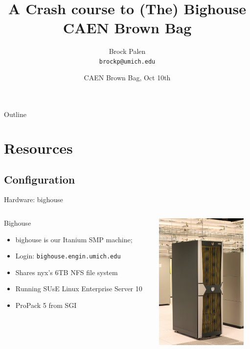 \documentclass[handout]{beamer}
\title[Bighouse Crash] {A Crash course to (The) Bighouse CAEN Brown Bag}
\author{Brock Palen\\ \texttt{brockp@umich.edu}}
\date{CAEN Brown Bag, Oct 10th}
\begin{document}
  \begin{frame}
    \titlepage
  \end{frame}

  \begin{frame}{Outline}
    \tableofcontents
  \end{frame}
  
  \section{Resources}
  \subsection {Configuration}
  \begin{frame}{Hardware: bighouse}
   \begin{columns}[c]
    \begin{column}{7cm}
    \begin{block}{Bighouse}
    \begin{itemize}
      \item bighouse is our Itanium SMP machine;
      \item Login: \texttt{bighouse.engin.umich.edu}
      \item Shares nyx's 6TB NFS file system
      \item Running SUsE Linux Enterprise Server 10
      \item ProPack 5 from SGI
    \end{itemize}
   \end{block}
   \end{column}
   \begin{column}{5cm}
    \begin{center}\includegraphics[height=2.7in]{tallbighouse}\end{center}
   \end{column}
   \end{columns}
  \end{frame}
\end{document}
